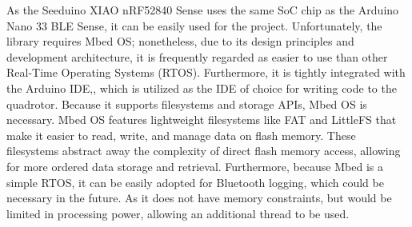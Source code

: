 As the Seeduino XIAO nRF52840 Sense uses the same SoC chip as the Arduino Nano 33 BLE Sense, it can be easily used for the project. \cite{Nano33} \cite{wikiSeeed}
Unfortunately, the library requires Mbed OS; nonetheless, due to its design principles and development architecture, it is frequently regarded as easier to use than other Real-Time Operating Systems (RTOS). Furthermore, it is tightly integrated with the Arduino IDE,\cite{MbedNano}, which is utilized as the IDE of choice for writing code to the quadrotor. Because it supports filesystems and storage APIs, Mbed OS is necessary. Mbed OS features lightweight filesystems like FAT and LittleFS that make it easier to read, write, and manage data on flash memory. \cite{MbedWiki}
These filesystems abstract away the complexity of direct flash memory access, allowing for more ordered data storage and retrieval. Furthermore, because Mbed is a simple RTOS, it can be easily adopted for Bluetooth logging, which could be necessary in the future. As it does not have memory constraints, but would be limited in processing power, allowing an additional thread to be used.